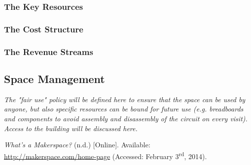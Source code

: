 \documentclass[a4paper, 11pt]{article}
\begin{document}
\subsubsection{The Key Resources} \label{sec:bm_res}

\subsubsection{The Cost Structure}

\subsubsection{The Revenue Streams}


\subsection{Space Management}
\textit{The "fair use" policy will be defined here to ensure that the space can be used by anyone, but also specific resources can be bound for future use (e.g. breadboards and components to avoid assembly and disassembly of the circuit on every visit). Access to the building will be discussed here.}

\newpage

\begin{thebibliography}{9}
     \emph{What’s a Makerspace?} (n.d.) [Online]. Available: \\ \href{http://makerspace.com/home-page}{http://makerspace.com/home-page} (Accessed: February 3\textsuperscript{rd}, 2014).
\end{thebibliography}
\end{document}
